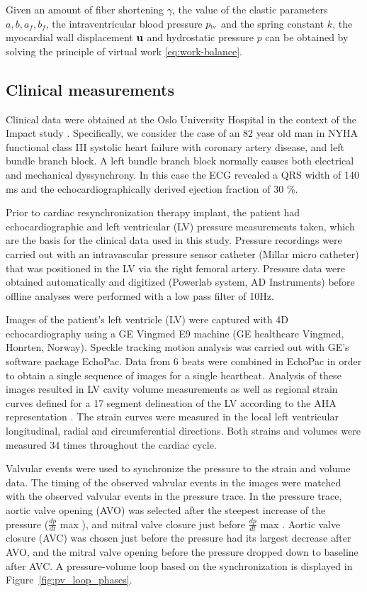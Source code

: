 Given an amount of fiber shortening $\gamma$, the value of the elastic
 parameters $a, b, a_f, b_f$, the intraventricular blood pressure
 $p_{\textnormal{\tiny{lv}}}$ and the spring constant $k$, the myocardial wall displacement
 $\mathbf{u}$ and hydrostatic pressure $p$ can be obtained by solving the
 principle of virtual work \eqref{eq:work-balance}. 

 \subsection{Clinical measurements}
\label{sec:clinical_measurements}
Clinical data were obtained at the Oslo
University Hospital in the context of the Impact study \cite{ImpactStudy2016}. Specifically,
we consider the case of an 82 year old man in NYHA functional 
class III systolic heart failure with coronary
artery disease, and left bundle branch block.
A left bundle branch block normally causes both electrical and mechanical 
dyssynchrony. In this case the ECG revealed a
QRS width of 140 ms and the echocardiographically derived ejection fraction of 30 \%.

Prior to cardiac resynchronization therapy implant,
the patient had echocardiographic and left ventricular (LV)
pressure measurements taken, which are the basis for the clinical
data used in this study. Pressure recordings were carried out
with an intravascular pressure sensor catheter
(Millar micro catheter) that was positioned in the LV
via the right femoral artery. Pressure data were
obtained automatically and digitized (Powerlab system, AD Instruments) 
before offline analyses were performed with a low pass filter of 10Hz.

Images of the patient's left ventricle (LV) were captured with 4D
echocardiography using a GE Vingmed E9 machine (GE healthcare Vingmed, Honrten, Norway).
Speckle tracking motion analysis was carried out with GE's software package
EchoPac. Data from 6 beats were combined in EchoPac in order 
to obtain a single sequence of images for a single heartbeat. Analysis 
of these images resulted in LV cavity volume measurements as well as
regional strain curves defined for a 17 segment delineation of the LV
according to the AHA representation \cite{cerqueira2002standardized}.
The strain curves were measured in
the local left ventricular longitudinal, radial and circumferential
directions. Both strains and volumes were measured 34 times throughout the
cardiac cycle.

Valvular events were used to synchronize the pressure to the strain and
volume data. The timing of the observed valvular events in the images
were matched with the observed valvular events in the pressure
trace. In the pressure trace, aortic valve opening (AVO) was selected after the
steepest increase of the pressure ($\frac{dp}{dt}$ max ), and mitral valve
closure just before $\frac{dp}{dt}$ max . Aortic
valve closure (AVC) was chosen just before the pressure had its largest
decrease after AVO, and the mitral valve opening
before the pressure dropped down to baseline after AVC. 
A pressure-volume loop based on the synchronization is displayed in
Figure~\ref{fig:pv_loop_phases}.

